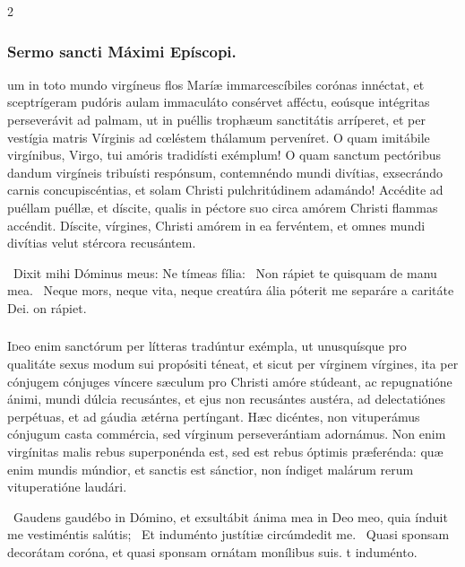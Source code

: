 \documentclass[9pt,twoside]{extarticle}
\begin{document}
\begin{multicols}{2}
\subsubsection*{\center Sermo sancti Máximi Epíscopi.}
\begin{center}\end{center}
um in toto mundo virgíneus flos Maríæ immarcescíbiles corónas innéctat, et sceptrígeram pudóris aulam immaculáto consérvet afféctu, eoúsque intégritas perseverávit ad palmam, ut in puéllis trophæum sanctitátis arríperet, et per vestígia matris Vírginis ad cœléstem thálamum perveníret. O quam imitábile virgínibus, Virgo, tui amóris tradidísti exémplum! O quam sanctum pectóribus dandum virgíneis tribuísti respónsum, contemnéndo mundi divítias, exsecrándo carnis concupiscéntias, et solam Christi pulchritúdinem adamándo! Accédite ad puéllam puéllæ, et díscite, qualis in péctore suo circa amórem Christi flammas accéndit. Díscite, vírgines, Christi amórem in ea fervéntem, et omnes mundi divítias velut stércora recusántem.

\begin{tightlist}{}
\item {}~Dixit mihi Dóminus meus: Ne tímeas fília: \textred{*}~Non rápiet te quisquam de manu mea. ~Neque mors, neque vita, neque creatúra ália póterit me separáre a caritáte Dei. on rápiet.
\end{tightlist}

\subsubsection*{\center {}}
\lettrine{I}deo enim sanctórum per lítteras tradúntur exémpla, ut unusquísque pro qualitáte sexus modum sui propósiti téneat, et sicut per vírginem vírgines, ita per cónjugem cónjuges víncere sæculum pro Christi amóre stúdeant, ac repugnatióne ánimi, mundi dúlcia recusántes, et ejus non recusántes austéra, ad delectatiónes perpétuas, et ad gáudia ætérna pertíngant. Hæc dicéntes, non vituperámus cónjugum casta commércia, sed vírginum perseverántiam adornámus. Non enim virgínitas malis rebus superponénda est, sed est rebus óptimis præferénda: quæ enim mundis múndior, et sanctis est sánctior, non índiget malárum rerum vituperatióne laudári.

\begin{tightlist}{}
\item {}~Gaudens gaudébo in Dómino, et exsultábit ánima mea in Deo meo, quia índuit me vestiméntis salútis; \textred{*}~Et induménto justítiæ circúmdedit me. ~Quasi sponsam decorátam coróna, et quasi sponsam ornátam monílibus suis. t induménto.
\end{tightlist}


\end{multicols}
\end{document}
